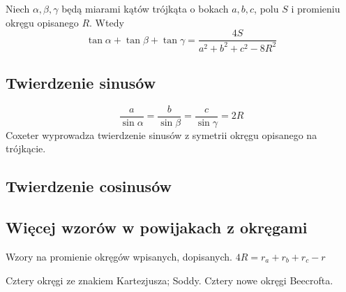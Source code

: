 \begin{proposition}
	Niech $\alpha, \beta, \gamma$ będą miarami kątów trójkąta o bokach $a, b, c$, polu $S$ i promieniu okręgu opisanego $R$.
	Wtedy
	\begin{equation}
		\tan \alpha + \tan \beta + \tan \gamma = \frac{4S}{a^2 + b^2 + c^2 - 8R^2}
	\end{equation}
\end{proposition}

\begin{theorem}
\end{theorem}



\subsection{Twierdzenie sinusów}

$$\frac{a}{\sin \alpha} = \frac{b}{\sin \beta} = \frac{c}{\sin \gamma} = 2R$$
Coxeter \cite[s. 28, 29]{coxeter_1967} wyprowadza twierdzenie sinusów z symetrii okręgu opisanego na trójkącie.

\subsection{Twierdzenie cosinusów}
%

%

\subsection{Więcej wzorów w powijakach z okręgami}
Wzory na promienie okręgów wpisanych, dopisanych.
$4R = r_a + r_b + r_c - r$ %

Cztery okręgi ze znakiem Kartezjusza; Soddy.
Cztery nowe okręgi Beecrofta.
%

